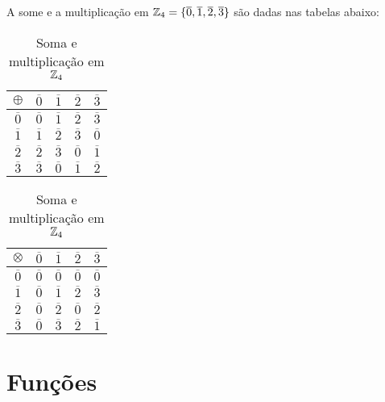 \begin{exemplo}
	A some e a multiplica{\c c}{\~a}o em $\mathbb{Z}_4 = \{\overline{0},\overline{1},\overline{2},\overline{3}\}$
	são dadas nas tabelas abaixo:
		\begin{table}[!htb]
		  \caption{Soma e multiplicação em $\mathbb{Z}_4$}
		  \begin{minipage}{.5\linewidth}
		    \centering
		 	\begin{tabular}{|c|c|c|c|c|} 
			    \hline
			    $\oplus$ & $\overline{0}$ & $\overline{1}$ & $\overline{2}$ & $\overline{3}$ \\
			    \hline
			    $\overline{0}$ & $\overline{0}$ & $\overline{1}$ & $\overline{2}$ & $\overline{3}$ \\
			    \hline
			    $\overline{1}$ & $\overline{1}$ & $\overline{2}$ & $\overline{3}$ & $\overline{0}$ \\
			    \hline
			    $\overline{2}$ & $\overline{2}$ & $\overline{3}$ & $\overline{0}$ & $\overline{1}$ \\
			    \hline
			    $\overline{3}$ & $\overline{3}$ & $\overline{0}$ & $\overline{1}$ & $\overline{2}$ \\
			    \hline
			\end{tabular}
		  \end{minipage}
		  \begin{minipage}{.5\linewidth}
		  \centering
		    \begin{tabular}{|c|c|c|c|c|} 
		      \hline
		      $\otimes$ & $\overline{0}$ & $\overline{1}$ & $\overline{2}$ & $\overline{3}$ \\
		      \hline
		      $\overline{0}$ & $\overline{0}$ & $\overline{0}$ & $\overline{0}$ & $\overline{0}$ \\
		      \hline
		      $\overline{1}$ & $\overline{0}$ & $\overline{1}$ & $\overline{2}$ & $\overline{3}$ \\
		      \hline
		      $\overline{2}$ & $\overline{0}$ & $\overline{2}$ & $\overline{0}$ & $\overline{2}$ \\
		      \hline
		      $\overline{3}$ & $\overline{0}$ & $\overline{3}$ & $\overline{2}$ & $\overline{1}$ \\
		      \hline
			\end{tabular}
		\end{minipage}
	\end{table}
\end{exemplo}

\section{Fun{\c c}{\~o}es}

